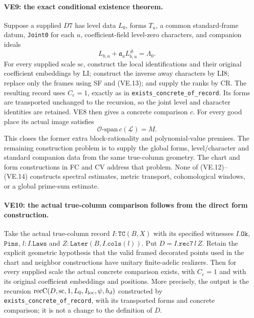 \documentclass[11pt,a4paper]{article}
\numberwithin{equation}{section}
\theoremstyle{remark}\newtheorem{remark}[theorem]{Remark}
\begin{document}
\paragraph{VE9: the exact conditional existence theorem.}
Suppose a supplied $D7$ has level data $L_0$, forms $T_u$, a common
standard-frame datum, \texttt{Joint0} for each $u$, coefficient-field
level-zero characters, and companion ideals
\[
 L_{b,u}+\mathfrak a_u L_{b,u}^{\#}=\Lambda_0.
                                                        \tag{VE.13}
\]
For every supplied scale $\mathrm{sc}$, construct the local
identifications and their original coefficient embeddings by LI;
construct the inverse away characters by LI8; replace only the frames
using SF and (VE.13); and supply the ranks by CR. The resulting
record uses $C_e=1$, exactly as in
\texttt{exists\_\allowbreak concrete\_\allowbreak of\_\allowbreak record}. Its forms are transported
unchanged to the recursion, so the joint level and character
identities are retained. VE8 then gives a concrete comparison $c$.
For every good place its actual image satisfies
\[
 \boxed{\quad\mathcal O\text{-span}\,c(\mathcal L)=M.\quad}
                                                        \tag{VE.14}
\]
This closes the former extra block-rationality and polynomial-value
premises. The remaining construction problem is to supply the
global forms, level/character and standard companion data from
the same true-column geometry. The chart and form constructions
in FC and CV address that problem. None of
(VE.12)--(VE.14) constructs spectral estimates, metric transport,
cohomological windows, or a global prime-sum estimate.

\paragraph{VE10: the actual true-column comparison follows from the direct form construction.}
Take the actual true-column record $I:\texttt{TC}(B,X)$ with its
specified witnesses $I.\texttt{Ok}$, $\texttt{Pins}$,
$l:I.\texttt{Laws}$ and $Z:\texttt{Later}(B,I.\texttt{cols}(l))$.
Put $D=I.\texttt{rec7}\,l\,Z$. Retain the explicit geometric
hypothesis that the valid framed decorated points used in the chart
and neighbor constructions have unitary finite-adelic realizers.
Then for every supplied scale the actual concrete comparison exists,
with $C_e=1$ and with its original coefficient embeddings and positions.
More precisely, the output is the recursion
$\operatorname{recC}(D,\mathrm{sc},1,L_0,I_{\rm loc},\psi,h_d)$
constructed by \texttt{exists\_\allowbreak concrete\_\allowbreak of\_\allowbreak record}, with its transported
forms and concrete comparison; it is not a change to the definition of $D$.
\end{document}
